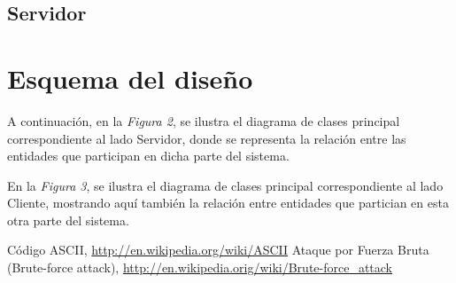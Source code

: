 \documentclass{article}
\begin{document}
\subsection{Servidor}

	\bigskip




\section{Esquema del diseño}

	A continuación, en la \textit{Figura 2}, se ilustra el diagrama de clases principal correspondiente al lado Servidor, donde se representa la relación entre las entidades que participan en dicha parte del sistema. 



	En la \textit{Figura 3}, se ilustra el diagrama de clases principal correspondiente al lado Cliente, mostrando aquí también la relación entre entidades que partician en esta otra parte del sistema.

\bigskip\bigskip




\begin{thebibliography}{99}

	 Código ASCII, \url{http://en.wikipedia.org/wiki/ASCII}
	 Ataque por Fuerza Bruta (Brute-force attack), \url{http://en.wikipedia.orig/wiki/Brute-force_attack}
	\end{thebibliography}

\newpage
\end{document}
